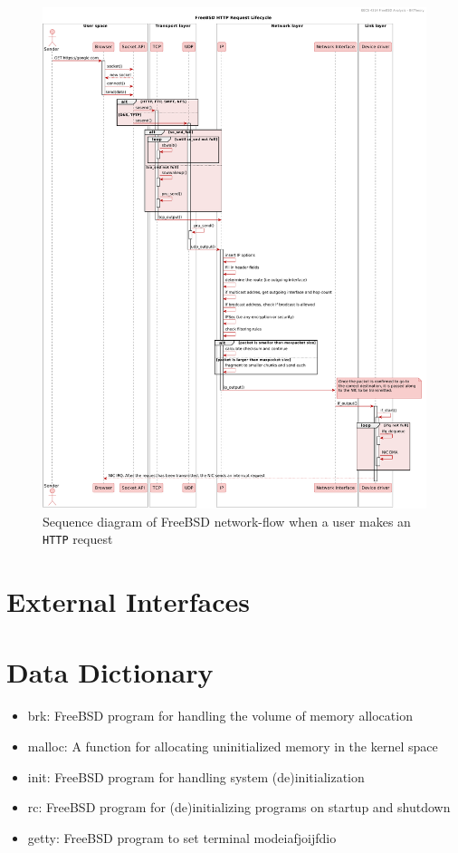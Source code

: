 \documentclass[12pt, dvipsnames, a4paper]{article}
\newcommand{\code}[1]{\texttt{#1}}
\begin{document}
\begin{figure}[!htb]
	\advance\leftskip-0.5cm
	\includegraphics[width = 570pt]{assets/sequence_diagrams/network-send-flow.pdf}
	\caption{Sequence diagram of FreeBSD network-flow when a user makes an \code{HTTP} request}
\end{figure}
\clearpage

\section{External Interfaces}
\lipsum[1]

\section{Data Dictionary}
\begin{itemize}
	\item{brk: FreeBSD program for handling the volume of memory allocation}
	\item{malloc: A function for allocating uninitialized memory in the kernel space}
           \item{init: FreeBSD program for handling system (de)initialization}
           \item{rc: FreeBSD program for (de)initializing programs on startup and shutdown}
           \item{getty: FreeBSD program to set terminal modeiafjoijfdio}
\end{itemize}
\end{document}
